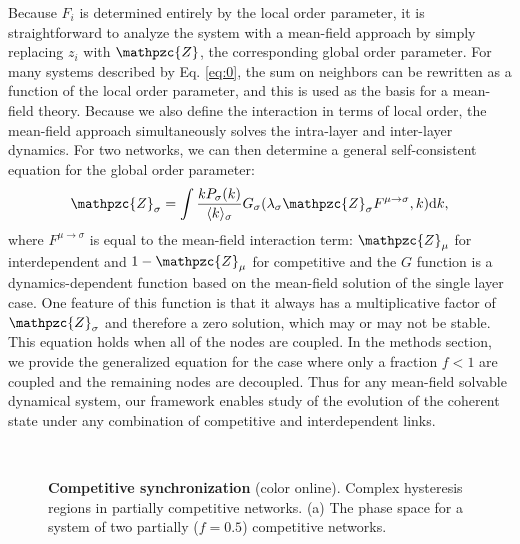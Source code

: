 \documentclass[pre,twocolumn,superscriptaddress]{revtex4}
\newcommand{\1}{\mathds{1}}
\begin{document}
{Because $F_i$ is determined entirely by the local order parameter, it is straightforward to analyze the system with a mean-field approach by simply replacing $z_i$ with $\mathpzc{Z}$, the corresponding global order parameter.  
For many systems described by Eq. \eqref{eq:0}, the sum on neighbors can be rewritten as a function of the local order parameter, and this is used as the basis for a mean-field theory.  
Because we also define the interaction in terms of local order, the mean-field approach simultaneously solves the intra-layer and inter-layer dynamics.
For two networks, we can then determine a general self-consistent equation for the global order parameter:
\begin{equation}\label{eq:genselfconst}
    \mathpzc{Z}_\sigma = \int \frac{k P_\sigma(k)}{\langle k\rangle_\sigma} G_\sigma(\lambda_\sigma \mathpzc{Z}_\sigma F^{\mu\to\sigma}, k)\mathrm{d}k,
\end{equation}
where $F^{\mu\to\sigma}$ is equal to the mean-field interaction term: $\mathpzc{Z}_\mu$ for interdependent and $1 - \mathpzc{Z}_\mu$ for competitive and the $G$ function is a dynamics-dependent function based on the mean-field solution of the single layer case. One feature of this function is that it always has a multiplicative factor of $\mathpzc{Z}_\sigma$ and therefore a zero solution, which may or may not be stable.
This equation holds when all of the nodes are coupled.
In the methods section, we provide the generalized equation for the case where only a fraction $f<1$ are coupled and the remaining nodes are decoupled.
Thus for any mean-field solvable dynamical system, our framework enables study of the evolution of the coherent state under any combination of competitive and interdependent links.
\begin{figure*}
    \centering
    \begin{minipage}{0.35\textwidth}
    \end{minipage}
    \begin{minipage}{0.62\textwidth}
    \\
    \end{minipage}
    \caption{{\bf Competitive synchronization} (color online). Complex hysteresis regions in partially competitive networks.
    (a) The phase space for a system of two partially ($f=0.5$) competitive networks.
}
\end{figure*}}
\end{document}
